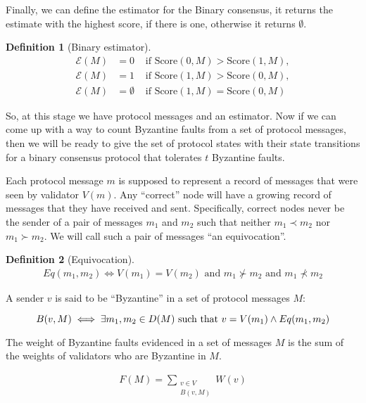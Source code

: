 \documentclass{article}
\theoremstyle{definition}
\newtheorem{defn}{Definition}[section]
\begin{document}
Finally, we can define the estimator for the Binary consensus, it returns the estimate with the highest score, if there is one, otherwise it returns $\emptyset$.

\begin{defn}[Binary estimator]
\begin{align}
  \mathcal{E}(M) &= 0 &\text{ if } \text{Score}(0, M) > \text{Score}(1, M), \\
  \mathcal{E}(M) &= 1 &\text{ if } \text{Score}(1, M) > \text{Score}(0, M), \\
  \mathcal{E}(M) &= \emptyset &\text{ if } \text{Score}(1, M) = \text{Score}(0, M)
\end{align}
\end{defn}

So, at this stage we have protocol messages and an estimator. Now if we can come up with a way to count Byzantine faults from a set of protocol messages, then we will be ready to give the set of protocol states with their state transitions for a binary consensus protocol that tolerates $t$ Byzantine faults.

Each protocol message $m$ is supposed to represent a record of messages that were seen by validator $V(m)$. Any ``correct'' node will have a growing record of messages that they have received and sent. Specifically, correct nodes never be the sender of a pair of messages $m_1$ and $m_2$ such that neither $m_1 \prec m_2$ nor $m_1 \succ m_2$. We will call such a pair of messages ``an equivocation''.


\begin{defn}[Equivocation]
\begin{align}
Eq(m_1, m_2) \iff V(m_1) = V(m_2) \text{ and } m_1 \nsucc m_2 \text{ and } m_1 \nprec m_2
\end{align}
\end{defn}

A sender $v$ is said to be ``Byzantine'' in a set of protocol messages $M$:

$$
B(v,M) \iff \exists m_1, m_2 \in D(M) \text{ such that } \\ v = V(m_1) \land Eq(m_1, m_2)
$$

The weight of Byzantine faults evidenced in a set of messages $M$ is the sum of the weights of validators who are Byzantine in $M$.

\begin{align}
F(M) = \sum_{\substack{v \in V \\ B(v, M)}} W(v)
\end{align}
\end{document}
